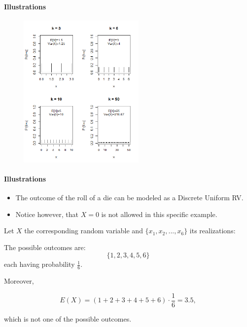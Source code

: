 \documentclass[smaller]{beamer}\usepackage[]{graphicx}\usepackage[]{color}
\begin{document}
\begin{frame}{\secname}%
\framesubtitle{Illustrations}
  \begin{figure}[ptb]\centering
  \includegraphics[width=0.55\textwidth, height=0.8 \textheight]{img/discrete_uniforms__1.pdf}%
  \end{figure}
\end{frame}

\begin{frame}{\secname}
  \framesubtitle{Illustrations}
  \begin{example}
  \begin{footnotesize}
  \begin{itemize}
  \item The outcome of the roll of a die can be modeled as a Discrete Uniform RV.
  \item Notice however, that $X=0$ is not allowed in this specific example.
\end{itemize}
\medskip
  Let $X$ the corresponding random variable and $\{x_1,x_2,...,x_6\}$ its realizations:  \bigskip

  The possible outcomes are:
  $$ \{1,2,3,4,5,6\}$$
  each having probability $\frac{1}{6}$. \medskip

  Moreover,

  $$E(X) = (1+2+3+4+5+6) \cdot \frac{1}{6} = 3.5,$$

  which is not one of the possible outcomes.
  \end{footnotesize}
  \end{example}

\end{frame}

\end{document}
